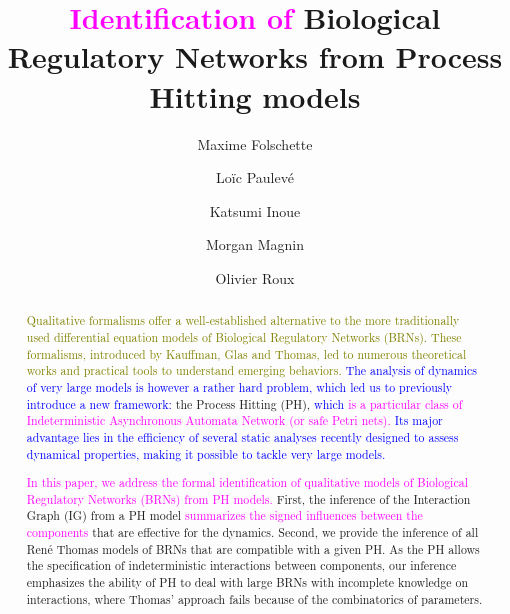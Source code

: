 \documentclass[preprint]{elsarticle}
\def\modLP#1{\textcolor{magenta}{#1}}
\def\modMM#1{\textcolor{blue}{#1}}
\def\modOR#1{\textcolor{olive}{#1}}
\begin{document}
\begin{frontmatter}

\title{\modLP{Identification of} Biological Regulatory Networks from Process Hitting models}

\author[irccyn,nii]{Maxime Folschette}
\author[lri]{Lo\"ic Paulev\'e}
\author[nii]{Katsumi Inoue}
\author[irccyn,nii]{Morgan Magnin}
\author[irccyn]{Olivier Roux}

\address[irccyn]{LUNAM Universit\'e, \'Ecole Centrale de Nantes, IRCCyN UMR CNRS 6597\\
(Institut de Recherche en Communications et Cybern\'etique de Nantes)\\
1 rue de la No\"e - B.P. 92101 - 44321 Nantes Cedex 3, France.}
\address[nii]{National Institute of Informatics,\\
2-1-2, Hitotsubashi, Chiyoda-ku, Tokyo 101-8430, Japan.}
\address[lri]{CNRS, Laboratoire de Recherche en Informatique UMR CNRS 8623\\
Universit\'e Paris-Sud, 91405 Orsay Cedex, France}


\begin{abstract}
\modOR{Qualitative formalisms offer a well-established alternative to the more traditionally used differential equation models of Biological Regulatory Networks (BRNs). These formalisms, introduced by Kauffman, Glas and Thomas, led to numerous theoretical works and practical tools to understand emerging behaviors.} \modMM{The analysis of dynamics of very large models is however a rather hard problem, which led us to previously introduce a new framework:} the Process Hitting (PH), \modMM{which} \modLP{is a particular class of Indeterministic Asynchronous Automata
Network (or safe Petri nets).} \modMM{Its major advantage lies in the efficiency of several static analyses recently designed to assess dynamical properties, making it possible to tackle very large models.}

\modLP{In this paper, we address the formal identification of qualitative
models of Biological Regulatory Networks (BRNs) from PH models.}
First, the inference of the Interaction Graph (IG) from a PH model
\modLP{summarizes the signed influences between the components} that are effective for the dynamics.
Second, we provide the inference of all Ren\'e Thomas models of BRNs 
that are compatible with a given PH.
As the PH allows the specification of indeterministic interactions between
components, our inference emphasizes the ability of PH to deal with large BRNs with incomplete knowledge
on interactions, where Thomas' approach fails because of the combinatorics of parameters.


\end{abstract}
\end{frontmatter}
\end{document}
